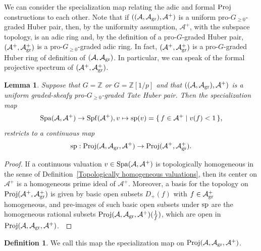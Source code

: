 \documentclass[12pt,twoside,a4paper]{article}
\newtheorem{lemma}[thm]{Lemma}
\theoremstyle{definition}
\newtheorem{mydef}[thm]{Definition}
\theoremstyle{remark}
\newcommand\gr{{\rm gr}}
\newcommand\Proj{{\rm Proj}}
\newcommand\spc{{\rm sp}}
\newcommand\Spa{{\rm Spa}}
\newcommand\Spf{{\rm Spf}}
\begin{document}
We can consider the specialization map relating the adic and formal $\Proj$ constructions to each other. Note that if $((\mathcal{A}, \mathcal{A}_{\gr}), \mathcal{A}^{+})$ is a uniform pro-$G_{\geq0}$-graded Huber pair, then, by the uniformity assumption, $\mathcal{A}^{+}$, with the subspace topology, is an adic ring and, by the definition of a pro-$G$-graded Huber pair, $(\mathcal{A}^{+}, \mathcal{A}_{\gr}^{+})$ is a pro-$G_{\geq0}$-graded adic ring. In fact, $(\mathcal{A}^{+}, \mathcal{A}_{\gr}^{+})$ is a pro-$G$-graded Huber ring of definition of $(\mathcal{A}, \mathcal{A}_{\gr})$. In particular, we can speak of the formal projective spectrum of $(\mathcal{A}^{+}, \mathcal{A}_{\gr}^{+})$. 
\begin{lemma}\label{Specialization map, definition}Suppose that $G=\mathbb{Z}$ or $G=\mathbb{Z}[1/p]$ and that $((\mathcal{A}, \mathcal{A}_{\gr}), \mathcal{A}^{+})$ is a uniform graded-sheafy pro-$G_{\geq0}$-graded Tate Huber pair. Then the specialization map \begin{equation*}\Spa(\mathcal{A}, \mathcal{A}^{+})\to \Spf(\mathcal{A}^{+}), v\mapsto \spc(v)=\{\, f\in \mathcal{A}^{+}\mid v(f)<1\,\},\end{equation*}restricts to a continuous map \begin{equation*}\spc: \Proj(\mathcal{A}, \mathcal{A}_{\gr}, \mathcal{A}^{+})\to \Proj(\mathcal{A}^{+}, \mathcal{A}_{\gr}^{+}).\end{equation*}\end{lemma}
\begin{proof}If a continuous valuation $v\in \Spa(\mathcal{A}, \mathcal{A}^{+})$ is topologically homogeneous in the sense of Definition~\ref{Topologically homogeneous valuations}, then its center on $\mathcal{A}^{+}$ is a homogeneous prime ideal of $\mathcal{A}^{+}$. Moreover, a basis for the topology on $\Proj(\mathcal{A}^{+}, \mathcal{A}_{\gr}^{+})$ is given by basic open subsets $D_{+}(f)$ with $f\in \mathcal{A}_{\gr}^{+}$ homogeneous, and pre-images of such basic open subsets under $\spc$ are the homogeneous rational subsets $\Proj(\mathcal{A}, \mathcal{A}_{\gr}, \mathcal{A}^{+})(\frac{1}{f})$, which are open in $\Proj(\mathcal{A}, \mathcal{A}_{\gr}, \mathcal{A}^{+})$. \end{proof}
\begin{mydef}\label{Specialization map, actual definition}We call this map the specialization map on $\Proj(\mathcal{A}, \mathcal{A}_{\gr}, \mathcal{A}^{+})$.\end{mydef} 
\end{document}
